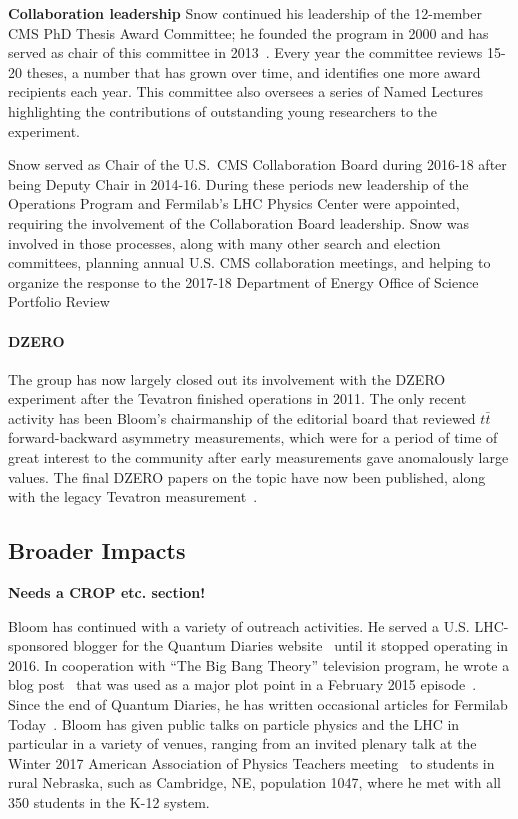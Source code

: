 {\bf Collaboration leadership}
Snow continued his leadership of the 12-member CMS PhD Thesis Award Committee; he founded the program in 2000 and has served as chair of this committee in 2013~\cite{bib:thesisawardwebsite}.  Every year the committee reviews 15-20 theses, a number that has grown over time, and identifies one more award recipients each year.  This committee also oversees a series of Named Lectures highlighting the contributions of outstanding young researchers to the experiment.

Snow served as Chair of the U.S.~CMS Collaboration Board during 2016-18 after being Deputy Chair in 2014-16.  During these periods new leadership of the Operations Program and Fermilab's LHC Physics Center were appointed, requiring the involvement of the Collaboration Board leadership.  Snow was involved in those processes, along with many other search and election committees, planning annual U.S. CMS collaboration meetings, and helping to organize the response to the 2017-18 Department of Energy Office of Science Portfolio Review~\cite{bib:portfolioreview}

\paragraph{DZERO}
The group has now largely closed out its involvement with the DZERO experiment after the Tevatron finished operations in 2011.  The only recent activity has been Bloom's chairmanship of the editorial board that reviewed $t\bar{t}$ forward-backward asymmetry measurements, which were for a period of time of great interest to the community after early measurements gave anomalously large values.  The final DZERO papers on the topic have now been published, along with the legacy Tevatron measurement~\cite{bib:D0afb}.

\subsection{Broader Impacts}

{\bf Needs a CROP etc. section!}

Bloom has continued with a variety of outreach activities.  He served a U.S. LHC-sponsored blogger for the Quantum Diaries website~\cite{bib:bloomblog} until it stopped operating in 2016.  In cooperation with ``The Big Bang Theory'' television program, he wrote a blog post~\cite{bib:TBBTQD} that was used as a major plot point in a February 2015 episode~\cite{bib:TBBTepisode}.  Since the end of Quantum Diaries, he has written occasional articles for Fermilab Today~\cite{bib:BloomFNALToday}.  Bloom has given public talks on particle physics and the LHC in particular in a variety of venues, ranging from an invited plenary talk at the Winter 2017 American Association of Physics Teachers meeting~\cite{bib:BloomAAPT} to students in rural Nebraska, such as Cambridge, NE, population 1047, where he met with all 350 students in the K-12 system.


